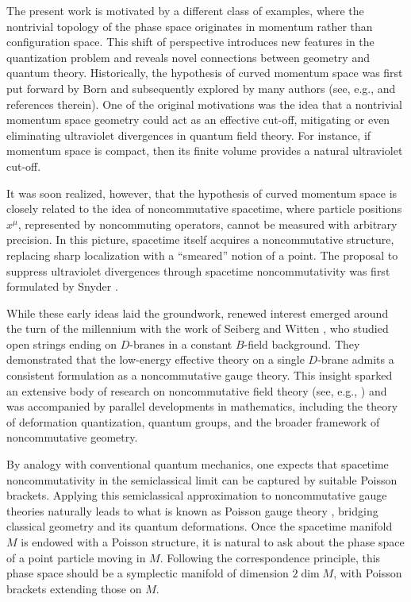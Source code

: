 \documentclass[12pt,a4paper]{article}
\numberwithin{equation}{section}
\theoremstyle{theorem}
\theoremstyle{remark}
\begin{document}
The present work is motivated by a different class of examples, where the nontrivial topology of the phase space originates in momentum rather than   configuration space. This shift of perspective introduces new features in the quantization problem and reveals novel connections between geometry and quantum theory. Historically, the hypothesis of curved momentum space was first put forward by Born \cite{Born,born1949reciprocity} and subsequently explored by many authors (see, e.g., \cite{Golfand:1962kjf,Tamm,Kadyshevsky:1977mu,Amelino-Camelia:2011lvm,KOWALSKI_GLIKMAN_2013,Franchino-Vinas:2023rcc} and references therein). One of the original motivations was the idea that a nontrivial momentum space geometry could act as an effective cut-off, mitigating or even eliminating ultraviolet divergences in quantum field theory. 
For instance, if momentum space is compact, then its finite volume provides a natural ultraviolet cut-off.


It was soon realized, however, that the hypothesis of curved momentum space is closely related to the idea of noncommutative spacetime, where particle positions $x^\mu$, represented by  noncommuting operators, cannot be measured with arbitrary precision. In this picture, spacetime itself acquires a noncommutative structure, replacing sharp localization with a ``smeared'' notion of a point.
The proposal to suppress ultraviolet divergences through spacetime noncommutativity was first formulated by Snyder \cite{Snyder1,Snyder2}. 

While these early ideas laid the groundwork, renewed interest emerged around the turn of the millennium with the work of Seiberg and Witten \cite{Seiberg_1999}, who studied open strings ending on $D$-branes in a constant $B$-field background. They demonstrated that the low-energy effective theory on a single $D$-brane admits a consistent formulation as a noncommutative gauge theory. This insight sparked an extensive body of research on noncommutative field theory (see, e.g., \cite{Douglas:2001ba, Szabo:2001kg, Hersent:2022gry}) and was accompanied by parallel developments in mathematics, including the theory of deformation quantization, quantum groups, and the broader framework of noncommutative geometry.


By analogy with conventional quantum mechanics, one expects that spacetime noncommutativity in the semiclassical limit can be captured by suitable Poisson brackets.
Applying this semiclassical approximation to noncommutative gauge theories naturally leads to what is known as Poisson gauge theory \cite{kupriyanov2021poisson,Kupriyanov_2021,Kupriyanov:2022ohu,Kupriyanov:2023gjj},  bridging classical geometry  and its quantum deformations. 
Once the spacetime manifold $M$ is endowed with a Poisson structure, it is natural to ask about the phase space of a point particle moving in $M$. Following the correspondence principle, this phase space should be a symplectic manifold of dimension $2\dim M$, with Poisson brackets extending those on $M$. 
\end{document}
